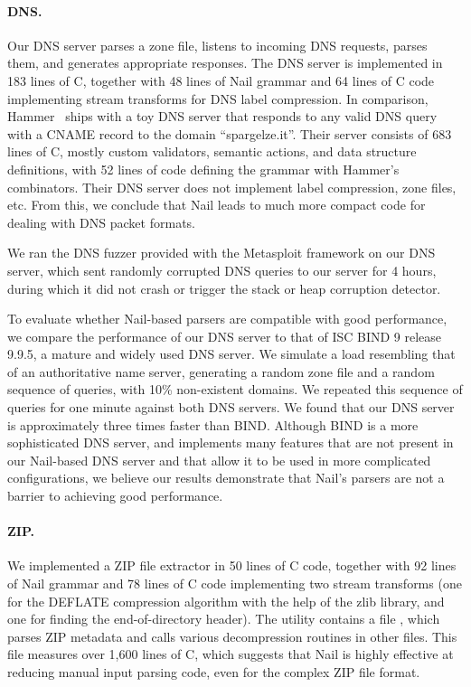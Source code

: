 \paragraph{DNS.}

Our DNS server parses a zone file, listens to incoming DNS requests,
parses them, and generates appropriate responses.  The DNS server is
implemented in 183 lines of C, together with 48 lines of Nail grammar
and 64 lines of C code implementing stream transforms for DNS label
compression.  In comparison, Hammer~\cite{hammer-parser} ships with a toy
DNS server that responds to any valid DNS query with a CNAME record to the
domain ``spargelze.it''.  Their server consists of 683 lines of C, mostly
custom validators, semantic actions, and data structure definitions, with
 52 lines of code defining the grammar with Hammer's combinators.
Their DNS server does not implement label compression, zone files, etc.
From this, we conclude that Nail leads to much more compact code for
dealing with DNS packet formats.

We ran the DNS fuzzer provided with the Metasploit
framework on our DNS server, which sent randomly
corrupted DNS queries to our server for 4 hours, during which it did
not crash or trigger the stack or heap corruption detector.

To evaluate whether Nail-based parsers are compatible with good
performance, we compare the performance of our DNS server to that of ISC
BIND 9 release 9.9.5, a mature and widely used DNS server.
We simulate a load resembling that of an authoritative name server, generating a random zone file
and a random sequence of queries, with 10\% non-existent domains. We repeated this sequence of
queries for one minute against both DNS servers. We found that our DNS server is approximately three
times faster than BIND. Although BIND is a more sophisticated DNS server,
and implements many features that are not present in our Nail-based DNS
server and that allow it to be used in more complicated configurations, 
we believe our results demonstrate that Nail's parsers are not
a barrier to achieving good performance.
\paragraph{ZIP.}

We implemented a ZIP file extractor in 50 lines of C code, together with
92 lines of Nail grammar and 78 lines of C code implementing two stream
transforms (one for the DEFLATE compression algorithm with the help of
the zlib library, and one for finding the end-of-directory header).
 The  utility contains a file , which parses
ZIP metadata and calls various decompression routines in other files. This
file measures over 1,600 lines of C, which suggests that Nail is highly
effective at reducing manual input parsing code, even for the complex
ZIP file format.

